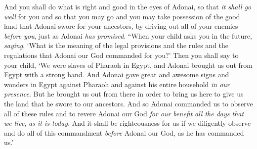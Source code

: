 \begin{biblechapter}
\verse And you shall do what is right and good in the eyes of Adonai, so that \textit{it shall go well} for you and so that you may go and you may take possession of the good land that Adonai swore for your ancestors,
\verse by driving out all of your enemies \textit{before you}, just as Adonai \textit{has promised}.
\verse “When your child asks you in the future, \textit{saying}, ‘What is the meaning of the legal provisions and the rules and the regulations that Adonai our God commanded for you?’
\verse Then you shall say to your child, ‘We were slaves of Pharaoh in Egypt, and Adonai brought us out from Egypt with a strong hand.
\verse And Adonai gave great and awesome signs and wonders in Egypt against Pharaoh and against his entire household \textit{in our presence}.
\verse But he brought us out from there in order to bring us here to give us the land that he swore to our ancestors.
\verse And so Adonai commanded us to observe all of these rules and to revere Adonai our God \textit{for our benefit} \textit{all the days that we live}, \textit{as it is today}.
\verse And it shall be righteousness for us if we diligently observe and do all of this commandment \textit{before} Adonai our God, as he has commanded us.’
\end{biblechapter}

